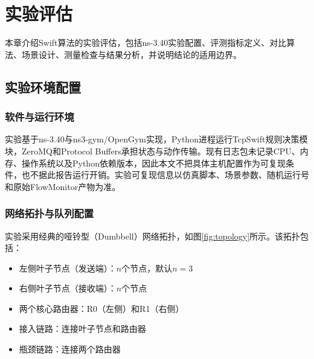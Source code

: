 \chapter{实验评估}\label{Chap:chap4}

本章介绍Swift算法的实验评估，包括ns-3.40实验配置、评测指标定义、对比算法、场景设计、测量检查与结果分析，并说明结论的适用边界。

\section{实验环境配置}

\subsection{软件与运行环境}

实验基于ns-3.40与ns3-gym/OpenGym实现，Python进程运行TcpSwift规则决策模块，ZeroMQ和Protocol Buffers承担状态与动作传输。现有日志包未记录CPU、内存、操作系统以及Python依赖版本，因此本文不把具体主机配置作为可复现条件，也不据此报告运行开销。实验可复现信息以仿真脚本、场景参数、随机运行号和原始FlowMonitor产物为准。

\subsection{网络拓扑与队列配置}
\label{sec:queue-ecn-caveat}

实验采用经典的哑铃型（Dumbbell）网络拓扑，如图\ref{fig:topology}所示。该拓扑包括：

\begin{itemize}
    \item 左侧叶子节点（发送端）：$n$个节点，默认$n=3$
    \item 右侧叶子节点（接收端）：$n$个节点
    \item 两个核心路由器：R0（左侧）和R1（右侧）
    \item 接入链路：连接叶子节点和路由器
    \item 瓶颈链路：连接两个路由器
\end{itemize}

